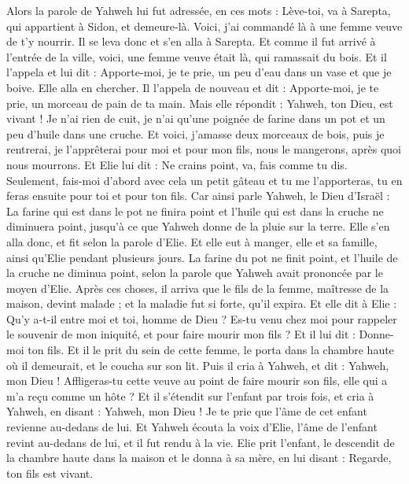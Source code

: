 \begin{multicols}{2}
Alors la parole de Yahweh lui fut adressée, en ces mots :
Lève-toi, va à Sarepta, qui appartient à Sidon, et demeure-là. Voici, j'ai commandé là à une femme veuve de t'y nourrir.
Il se leva donc et s'en alla à Sarepta. Et comme il fut arrivé à l’entrée de la ville, voici, une femme veuve était là, qui ramassait du bois. Et il l'appela et lui dit : Apporte-moi, je te prie, un peu d'eau dans un vase et que je boive.
Elle alla en chercher. Il l’appela de nouveau et dit : Apporte-moi, je te prie, un morceau de pain de ta main.
Mais elle répondit : Yahweh, ton Dieu, est vivant ! Je n'ai rien de cuit, je n'ai qu’une poignée de farine dans un pot et un peu d'huile dans une cruche. Et voici, j'amasse deux morceaux de bois, puis je rentrerai, je l'apprêterai pour moi et pour mon fils, nous le mangerons, après quoi nous mourrons.
Et Elie lui dit : Ne crains point, va, fais comme tu dis. Seulement, fais-moi d’abord avec cela un petit gâteau et tu me l’apporteras, tu en feras ensuite pour toi et pour ton fils.
Car ainsi parle Yahweh, le Dieu d'Israël : La farine qui est dans le pot ne finira point et l'huile qui est dans la cruche ne diminuera point, jusqu'à ce que Yahweh donne de la pluie sur la terre.
Elle s'en alla donc, et fit selon la parole d'Elie. Et elle eut à manger, elle et sa famille, ainsi qu’Elie pendant plusieurs jours.
La farine du pot ne finit point, et l'huile de la cruche ne diminua point, selon la parole que Yahweh avait prononcée par le moyen d'Elie.
Après ces choses, il arriva que le fils de la femme, maîtresse de la maison, devint malade ; et la maladie fut si forte, qu'il expira.
Et elle dit à Elie : Qu'y a-t-il entre moi et toi, homme de Dieu ? Es-tu venu chez moi pour rappeler le souvenir de mon iniquité, et pour faire mourir mon fils ?
Et il lui dit : Donne-moi ton fils. Et il le prit du sein de cette femme, le porta dans la chambre haute où il demeurait, et le coucha sur son lit.
Puis il cria à Yahweh, et dit : Yahweh, mon Dieu ! Affligeras-tu cette veuve au point de faire mourir son fils, elle qui a m’a reçu comme un hôte ?
Et il s'étendit sur l'enfant par trois fois, et cria à Yahweh, en disant : Yahweh, mon Dieu ! Je te prie que l'âme de cet enfant revienne au-dedans de lui.
Et Yahweh écouta la voix d'Elie, l'âme de l'enfant revint au-dedans de lui, et il fut rendu à la vie.
Elie prit l'enfant, le descendit de la chambre haute dans la maison et le donna à sa mère, en lui disant : Regarde, ton fils est vivant.

\end{multicols}
